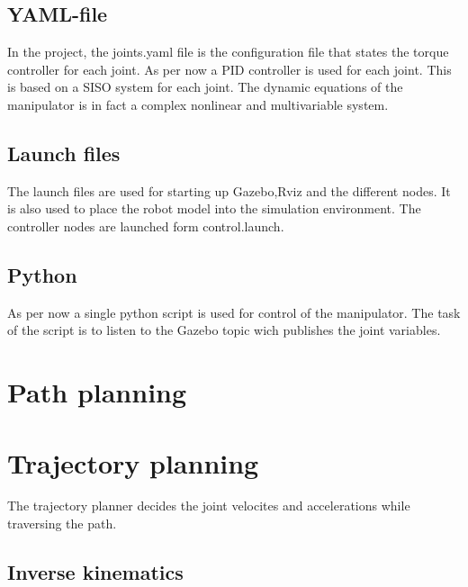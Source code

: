 \subsection*{YAML-file}
In the project, the joints.yaml file is the configuration file that states the torque controller for each joint. As per now a PID controller is used for each joint. This is based on a SISO system for each joint. The dynamic equations of the manipulator is in fact a complex nonlinear and multivariable system. 

\subsection*{Launch files}
The launch files are used for starting up Gazebo,Rviz and the different nodes. It is also used to place the robot model into the simulation environment. The controller nodes are launched form control.launch.





\subsection*{Python}
As per now a single python script is used for control of the manipulator. The task of the script is to listen to the Gazebo topic wich publishes the joint variables. 


\section*{Path planning}


\section*{Trajectory planning}
The trajectory planner decides the joint velocites and accelerations while traversing the path. 
\subsection*{Inverse kinematics}



